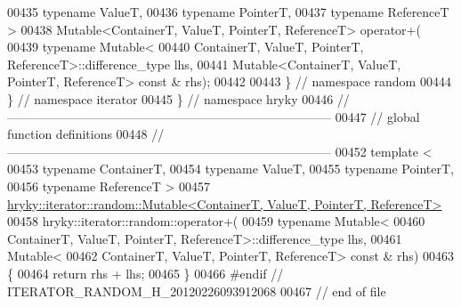 \begin{DoxyCode}
00435         \textcolor{keyword}{typename} ValueT,
00436         \textcolor{keyword}{typename} PointerT,
00437         \textcolor{keyword}{typename} ReferenceT >
00438     Mutable<ContainerT, ValueT, PointerT, ReferenceT> operator+(
00439         \textcolor{keyword}{typename} Mutable<
00440             ContainerT, ValueT, PointerT, ReferenceT>::difference\_type lhs,
00441         Mutable<ContainerT, ValueT, PointerT, ReferenceT> \textcolor{keyword}{const} & rhs);
00442     
00443 \} \textcolor{comment}{// namespace random}
00444 \} \textcolor{comment}{// namespace iterator}
00445 \} \textcolor{comment}{// namespace hryky}
00446 \textcolor{comment}{//
      ------------------------------------------------------------------------------}
00447 \textcolor{comment}{// global function definitions}
00448 \textcolor{comment}{//
      ------------------------------------------------------------------------------}
00452 \textcolor{comment}{}\textcolor{keyword}{template} <
00453     \textcolor{keyword}{typename} ContainerT,
00454     \textcolor{keyword}{typename} ValueT,
00455     \textcolor{keyword}{typename} PointerT,
00456     \textcolor{keyword}{typename} ReferenceT >
00457 \hyperlink{classhryky_1_1iterator_1_1random_1_1_mutable}{hryky::iterator::random::Mutable<ContainerT, ValueT, PointerT, ReferenceT>}
00458 hryky::iterator::random::operator+(
00459     \textcolor{keyword}{typename} Mutable<
00460         ContainerT, ValueT, PointerT, ReferenceT>::difference\_type lhs,
00461     Mutable<
00462         ContainerT, ValueT, PointerT, ReferenceT> \textcolor{keyword}{const} & rhs)
00463 \{
00464     \textcolor{keywordflow}{return} rhs + lhs;
00465 \}
00466 \textcolor{preprocessor}{#endif // ITERATOR\_RANDOM\_H\_20120226093912068}
00467 \textcolor{preprocessor}{}\textcolor{comment}{// end of file}
\end{DoxyCode}
